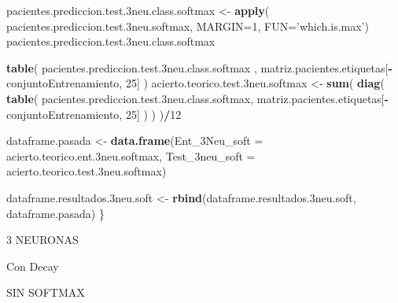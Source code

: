 \documentclass[]{article}
\newenvironment{Shaded}{\begin{snugshade}}{\end{snugshade}}
\newcommand{\KeywordTok}[1]{\textcolor[rgb]{0.13,0.29,0.53}{\textbf{#1}}}
\newcommand{\DataTypeTok}[1]{\textcolor[rgb]{0.13,0.29,0.53}{#1}}
\newcommand{\DecValTok}[1]{\textcolor[rgb]{0.00,0.00,0.81}{#1}}
\newcommand{\StringTok}[1]{\textcolor[rgb]{0.31,0.60,0.02}{#1}}
\newcommand{\OperatorTok}[1]{\textcolor[rgb]{0.81,0.36,0.00}{\textbf{#1}}}
\newcommand{\NormalTok}[1]{#1}
\begin{document}
\begin{Shaded}
\begin{Highlighting}[]
\NormalTok{  pacientes.prediccion.test.3neu.class.softmax <-}\StringTok{ }\KeywordTok{apply}\NormalTok{( pacientes.prediccion.test.3neu.softmax, }\DataTypeTok{MARGIN=}\DecValTok{1}\NormalTok{, }\DataTypeTok{FUN=}\StringTok{'which.is.max'}\NormalTok{)}
\NormalTok{  pacientes.prediccion.test.3neu.class.softmax}
  
  \KeywordTok{table}\NormalTok{( pacientes.prediccion.test.3neu.class.softmax , matriz.pacientes.etiquetas[}\OperatorTok{-}\NormalTok{conjuntoEntrenamiento, }\DecValTok{25}\NormalTok{] )}
\NormalTok{  acierto.teorico.test.3neu.softmax <-}\StringTok{ }\KeywordTok{sum}\NormalTok{( }\KeywordTok{diag}\NormalTok{( }\KeywordTok{table}\NormalTok{( pacientes.prediccion.test.3neu.class.softmax, matriz.pacientes.etiquetas[}\OperatorTok{-}\NormalTok{conjuntoEntrenamiento, }\DecValTok{25}\NormalTok{] ) ) )}\OperatorTok{/}\DecValTok{12}
  
  
\NormalTok{  dataframe.pasada <-}\StringTok{ }\KeywordTok{data.frame}\NormalTok{(}\DataTypeTok{Ent_3Neu_soft =}\NormalTok{ acierto.teorico.ent.3neu.softmax,}
                                 \DataTypeTok{Test_3neu_soft =}\NormalTok{ acierto.teorico.test.3neu.softmax)}
  
\NormalTok{  dataframe.resultados.3neu.soft <-}\StringTok{ }\KeywordTok{rbind}\NormalTok{(dataframe.resultados.3neu.soft, dataframe.pasada)}
\NormalTok{\}}
\end{Highlighting}
\end{Shaded}

3 NEURONAS

Con Decay

SIN SOFTMAX
\end{document}
